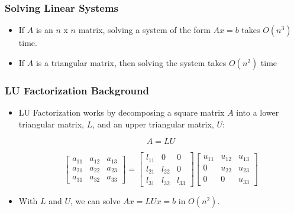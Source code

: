 \documentclass{beamer}
\begin{document}
\begin{frame}
\frametitle{Solving Linear Systems}

\begin{itemize}
\item If $A$ is an $ n $ x $ n $ matrix, solving a system of the form $ A x = b $ takes $ O(n^3) $ time.

\item If $ A$ is a triangular matrix, then solving the system takes $ O(n^2) $ time
\end{itemize}
\end{frame}

\begin{frame}
\frametitle{LU Factorization Background}

\begin{itemize}
\item LU Factorization works by decomposing a square matrix $A$ into a lower triangular matrix, $L$, and an upper triangular matrix, $U$:

$$ A = L U $$

$$ 
\begin{bmatrix}
	a_{11} &  a_{12} &  a_{13}  \\
	a_{21}  &  a_{22} &  a_{23}  \\
	a_{31}  &  a_{32}  &  a_{33}
\end{bmatrix}
=
\begin{bmatrix}
	l_{11} &  0 &  0  \\
	l_{21}  &  l_{22} &  0  \\
	l_{31}  &  l_{32}  &  l_{33}
\end{bmatrix}
\begin{bmatrix}
	u_{11} &  u_{12} &  u_{13}  \\
	0  &  u_{22} &  u_{23}  \\
	0  &  0  &  u_{33}
\end{bmatrix}
$$

\item With $ L $ and $ U $, we can solve $ A x = L U x = b $ in $ O(n^2) $.  


\end{itemize}
\end{frame}
\end{document}
